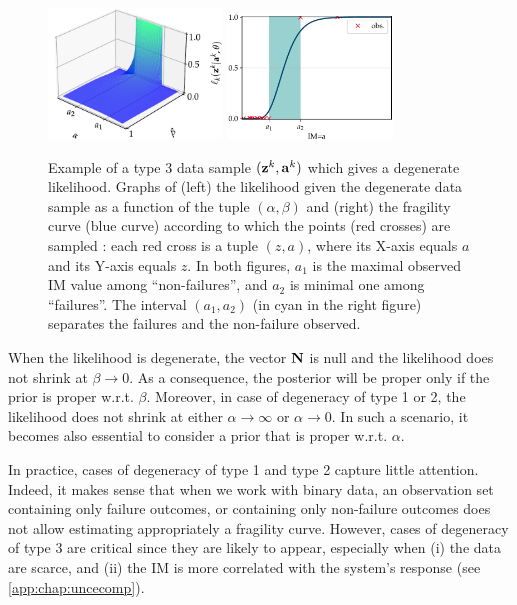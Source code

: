 \begin{figure}[h]
    \centering
    \includegraphics[width=4.6cm]{figures/PREM/likelihood_degen.pdf}\qquad
    \includegraphics[width=4.44cm]{figures/PREM/degeneracy.pdf}
    \caption{{Example of a type 3 data sample $(\mathbf{z}^k,\mathbf{a}^k)$ which gives a degenerate likelihood. Graphs of (left) the likelihood given the degenerate data sample as a function of the tuple $(\alpha,\beta)$ and (right) the fragility curve (blue curve) according to which the points (red crosses) are sampled : each red cross is a tuple $(z,a)$, where its X-axis equals $a$ and its Y-axis equals $z$.}
    In both figures, $a_1$ is the maximal observed IM value among ``non-failures'', and $a_2$ is minimal one among ``failures''.
    The interval $(a_1,a_2)$ (in cyan in the right figure) separates the failures and the non-failure observed.
    }
    \label{fig:constr-frags:degenerate-frag}
\end{figure}



When the likelihood is degenerate, the vector $\mathbf{N}$ is null and the likelihood does not shrink at $\beta\to0$.
As a consequence, the posterior will be proper only if the prior is proper w.r.t. $\beta$.
Moreover, in case of degeneracy of type 1 or 2, the likelihood does not shrink at either $\alpha\to\infty$ or $\alpha\to0$. In such a scenario, it becomes also essential to consider a prior that is proper  w.r.t. $\alpha$.

In practice, cases of degeneracy of type 1 and type 2 capture little attention. 
Indeed, it makes sense that when we work with binary data, an observation set containing only failure outcomes, or containing only non-failure outcomes does not allow estimating appropriately a fragility curve.
However, cases of degeneracy of type 3 are critical since they are likely to appear, especially when (i) the data are scarce, and (ii) the IM is more correlated with the system's response (see   \cref{app:chap:uncecomp}).


